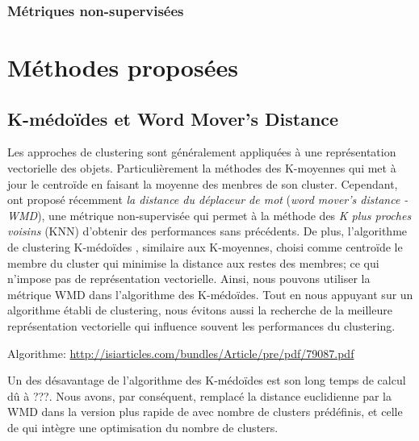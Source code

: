 \subsubsection{Métriques non-supervisées}
\label{sec:similarite:biblio:unsupeval}



\section{Méthodes proposées}

\subsection{K-médoïdes et \og Word Mover's Distance \fg}

Les approches de clustering sont généralement appliquées à une représentation vectorielle des objets. Particulièrement la méthodes des K-moyennes qui met à jour le centroïde en faisant la moyenne des menbres de son cluster. Cependant, \citet{kusner2015wordmoverdist} ont proposé récemment \textit{la distance du déplaceur de mot} (\textit{word mover's distance - WMD}), une métrique non-supervisée qui permet à la méthode des \textit{K plus proches voisins} (KNN) d'obtenir des performances sans précédents. De plus, l'algorithme de clustering K-médoïdes \citep{kaufman1987kmedoids}, similaire aux K-moyennes, choisi comme centroïde le membre du cluster qui minimise la distance aux restes des membres; ce qui n'impose pas de représentation vectorielle. Ainsi, nous pouvons utiliser la métrique WMD dans  l'algorithme des K-médoïdes. Tout en nous appuyant sur un algorithme établi de clustering, nous évitons aussi la recherche de la meilleure représentation vectorielle qui influence souvent les performances du clustering. 

Algorithme: \url{http://isiarticles.com/bundles/Article/pre/pdf/79087.pdf}


Un des désavantage de l'algorithme des K-médoïdes est son long temps de calcul dû à ???. Nous avons, par conséquent, remplacé la distance euclidienne par la WMD dans la version plus rapide de \cite{Park2009fastkmedoids} avec nombre de clusters prédéfinis, et celle de \cite{sabzi2011fuzzykmedoids} qui intègre une optimisation du nombre de clusters.

